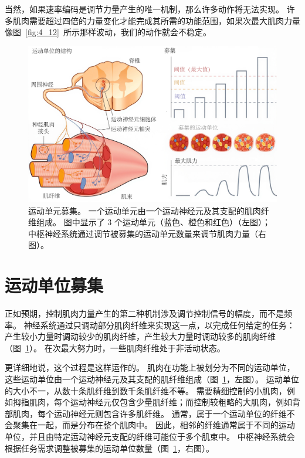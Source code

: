 当然，如果速率编码是调节力量产生的唯一机制，那么许多动作将无法实现。
许多肌肉需要超过四倍的力量变化才能完成其所需的功能范围，如果次最大肌肉力量像图~\ref{fig:4_12}~所示那样波动，我们的动作就会不稳定。


\begin{figure}[!htb]
	\centering
	\includegraphics[width=1.0\linewidth]{chap4/4_13}
	\caption{运动单元募集。
		一个运动单元由一个运动神经元及其支配的肌肉纤维组成。
		图中显示了 3 个运动单元（蓝色、橙色和红色）（左图）；
		中枢神经系统通过调节被募集的运动单元数量来调节肌肉力量（右图）。 \label{fig:4_13}}
\end{figure}


\section{运动单位募集}

正如预期，控制肌肉力量产生的第二种机制涉及调节控制信号的幅度，而不是频率。
神经系统通过只调动部分肌肉纤维来实现这一点，以完成任何给定的任务：产生较小力量时调动较少的肌肉纤维，产生较大力量时调动较多的肌肉纤维（图~\ref{fig:4_13}）。
在次最大努力时，一些肌肉纤维处于非活动状态。


更详细地说，这个过程是这样运作的。
肌肉在功能上被划分为不同的运动单位，这些运动单位由一个运动神经元及其支配的肌纤维组成（图~\ref{fig:4_13}，左图）。
运动单位的大小不一，从数十条肌纤维到数千条肌纤维不等。
需要精细控制的小肌肉，例如拇指肌肉，每个运动神经元仅包含少量肌纤维；而控制较粗略的大肌肉，例如背部肌肉，每个运动神经元则包含许多肌纤维。
通常，属于一个运动单位的纤维不会聚集在一起，而是分布在整个肌肉中。
因此，相邻的纤维通常属于不同的运动单位，并且由特定运动神经元支配的纤维可能位于多个肌束中。
中枢神经系统会根据任务需求调整被募集的运动单位数量（图~\ref{fig:4_13}，右图）。


